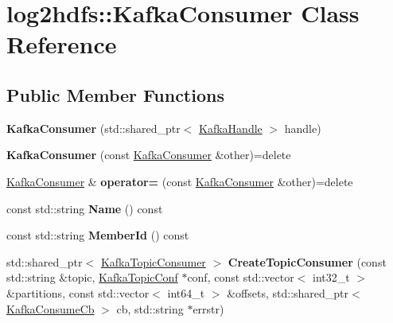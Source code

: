 \hypertarget{classlog2hdfs_1_1KafkaConsumer}{}\section{log2hdfs\+:\+:Kafka\+Consumer Class Reference}
\label{classlog2hdfs_1_1KafkaConsumer}
\subsection*{Public Member Functions}
\begin{DoxyCompactItemize}
\item 
{\bfseries Kafka\+Consumer} (std\+::shared\+\_\+ptr$<$ \hyperlink{classlog2hdfs_1_1KafkaHandle}{Kafka\+Handle} $>$ handle)\hypertarget{classlog2hdfs_1_1KafkaConsumer_af4e1f7a77ee5c7b713aae6cc7722ef20}{}\label{classlog2hdfs_1_1KafkaConsumer_af4e1f7a77ee5c7b713aae6cc7722ef20}

\item 
{\bfseries Kafka\+Consumer} (const \hyperlink{classlog2hdfs_1_1KafkaConsumer}{Kafka\+Consumer} \&other)=delete\hypertarget{classlog2hdfs_1_1KafkaConsumer_aa71f0b187f30908fd930f0103aaadb7a}{}\label{classlog2hdfs_1_1KafkaConsumer_aa71f0b187f30908fd930f0103aaadb7a}

\item 
\hyperlink{classlog2hdfs_1_1KafkaConsumer}{Kafka\+Consumer} \& {\bfseries operator=} (const \hyperlink{classlog2hdfs_1_1KafkaConsumer}{Kafka\+Consumer} \&other)=delete\hypertarget{classlog2hdfs_1_1KafkaConsumer_a21dc6d1b3dd655ceac6d31b389dca272}{}\label{classlog2hdfs_1_1KafkaConsumer_a21dc6d1b3dd655ceac6d31b389dca272}

\item 
const std\+::string {\bfseries Name} () const \hypertarget{classlog2hdfs_1_1KafkaConsumer_a6483ec9c17558953d4beae9fafeb9039}{}\label{classlog2hdfs_1_1KafkaConsumer_a6483ec9c17558953d4beae9fafeb9039}

\item 
const std\+::string {\bfseries Member\+Id} () const \hypertarget{classlog2hdfs_1_1KafkaConsumer_a43b5de3d00314b6ae52be31ef5ed7a00}{}\label{classlog2hdfs_1_1KafkaConsumer_a43b5de3d00314b6ae52be31ef5ed7a00}

\item 
std\+::shared\+\_\+ptr$<$ \hyperlink{classlog2hdfs_1_1KafkaTopicConsumer}{Kafka\+Topic\+Consumer} $>$ {\bfseries Create\+Topic\+Consumer} (const std\+::string \&topic, \hyperlink{classlog2hdfs_1_1KafkaTopicConf}{Kafka\+Topic\+Conf} $\ast$conf, const std\+::vector$<$ int32\+\_\+t $>$ \&partitions, const std\+::vector$<$ int64\+\_\+t $>$ \&offsets, std\+::shared\+\_\+ptr$<$ \hyperlink{classlog2hdfs_1_1KafkaConsumeCb}{Kafka\+Consume\+Cb} $>$ cb, std\+::string $\ast$errstr)\hypertarget{classlog2hdfs_1_1KafkaConsumer_aeffdb734cf330462b9ba3c2fe4d78ce9}{}\label{classlog2hdfs_1_1KafkaConsumer_aeffdb734cf330462b9ba3c2fe4d78ce9}


\end{DoxyCompactItemize}
